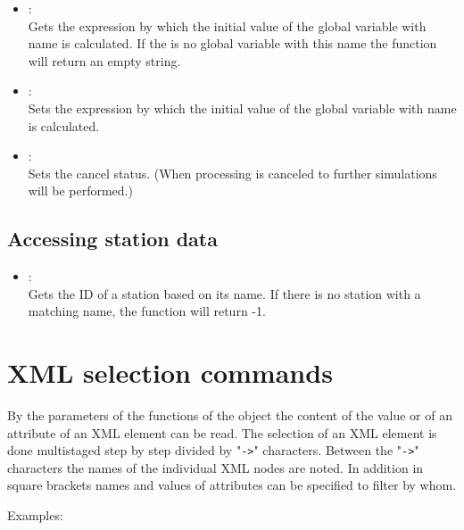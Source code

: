 \begin{itemize}
\item
{}:\\
Gets the expression by which the initial value of the global variable with
name  is calculated. If the is no global variable with
this name the function will return an empty string.

\item
{}:\\
Sets the expression by which the initial value of the global variable with
name  is calculated.

\item
{}:\\
Sets the cancel status. (When processing is canceled to further simulations will be performed.)

\end{itemize}

\section{Accessing station data}

\begin{itemize}

\item
{}:\\
Gets the ID of a station based on its name.
If there is no station with a matching name, the function will return -1.

\end{itemize}



\chapter{XML selection commands}

By the parameters of the functions of the  object the content of the
value or of an attribute of an XML element can be read.
The selection of an XML element is done multistaged step by step divided by
"\texttt{->}" characters. Between the "\texttt{->}" characters the names of the individual XML nodes are
noted. In addition in square brackets names and values of attributes can be specified to filter by whom.

Examples:

